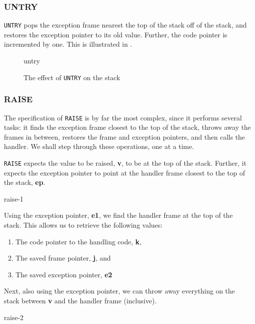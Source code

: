 \subsubsection{UNTRY}
\texttt{UNTRY} pops the exception frame nearest the top of the stack off of the stack, and restores the exception pointer to its old value. Further, the code pointer is incremented by one. This is illustrated in .

\begin{figure}[H]
    \centering
    {untry}
    \caption{The effect of \texttt{UNTRY} on the stack}
    \label{fig:untry-specification}
\end{figure}

\subsubsection{RAISE}\label{section:raise-specification}
The specification of \texttt{RAISE} is by far the most complex, since it performs several tasks: it finds the exception frame closest to the top of the stack, throws away the frames in between, restores the frame and exception pointers, and then calls the handler. We shall step through these operations, one at a time.

\texttt{RAISE} expects the value to be raised, \textbf{v}, to be at the top of the stack. Further, it expects the exception pointer to point at the handler frame closest to the top of the stack, \textbf{ep}.

\begin{center}
    {raise-1}
\end{center}

Using the exception pointer, \textbf{e1}, we find the handler frame at the top of the stack. This allows us to retrieve the following values:

\begin{enumerate}
    \item The code pointer to the handling code, \textbf{k},
    \item The saved frame pointer, \textbf{j}, and
    \item The saved exception pointer, \textbf{e2}
\end{enumerate}

Next, also using the exception pointer, we can throw away everything on the stack between \textbf{v} and the handler frame (inclusive).

\begin{center}
    {raise-2}
\end{center}

